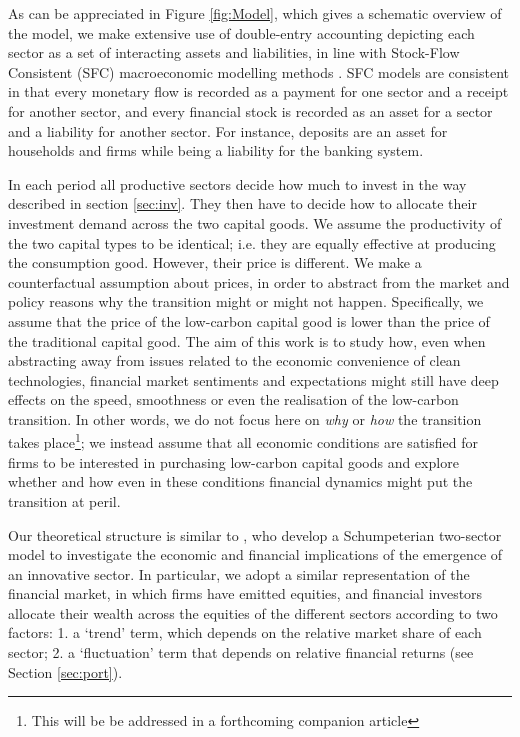 \documentclass[authoryear]{article}
\begin{document}
As can be appreciated in Figure \ref{fig:Model}, which gives a schematic overview of the model, we make extensive use of double-entry accounting depicting each sector as a set of interacting assets and liabilities, in line with Stock-Flow Consistent (SFC) macroeconomic modelling methods \citep{Caverzasi2015, Godley:2007}. SFC models are consistent in that every monetary flow is recorded as a payment for one sector and a receipt for another sector, and every financial stock is recorded as an asset for a sector and a liability for another sector. For instance, deposits are an asset for households and firms while being a liability for the banking system. 

In each period all productive sectors decide how much to invest in the way described in section \ref{sec:inv}. They then have to decide how to allocate their investment demand across the two capital goods. We assume the productivity of the two capital types to be identical; i.e. they are equally effective at producing the consumption good. However, their price is different. We make a counterfactual assumption about prices, in order to abstract from the market and policy reasons why the transition might or might not happen. Specifically, we assume that the price of the low-carbon capital good is lower than the price of the traditional capital good. The aim of this work is  to study how, even when abstracting away from issues related to the economic convenience of clean technologies, financial market sentiments and expectations might still have deep effects on the speed, smoothness or even the realisation of the low-carbon transition. In other words, we do not focus here on \emph{why} or \emph{how} the transition takes place\footnote{This will be be addressed in a forthcoming companion article}; we instead assume that all economic conditions are satisfied for firms to be interested in purchasing low-carbon capital goods and explore whether and how even in these conditions financial dynamics might put the transition at peril.

Our  theoretical structure is similar to \citet{Caiani2014}, who develop a Schumpeterian two-sector model to investigate the economic and financial implications of the emergence of an innovative sector. In particular, we adopt a similar representation of the financial market, in which firms have emitted equities, and financial investors allocate their wealth across the equities of the different sectors according to two factors: 1. a `trend' term, which depends on the relative market share of each sector; 2. a `fluctuation' term that depends on relative financial returns (see Section \ref{sec:port}). 
\end{document}
